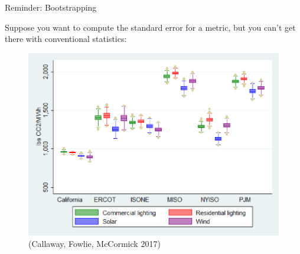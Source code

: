 \documentclass[mathserif, aspectratio=169]{beamer}
\begin{document}
\begin{frame}{Reminder: Bootstrapping}

Suppose you want to compute the standard error for a metric, but you can't get there with conventional statistics:

\begin{figure}
\includegraphics[height=0.7\textheight]{MEDR}
\caption*{\tiny (Callaway, Fowlie, McCormick 2017)}
\end{figure}
\end{frame}
\end{document}
